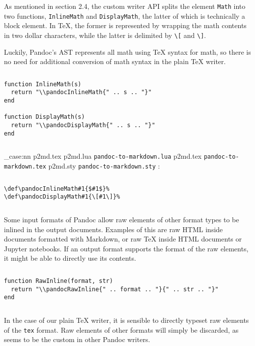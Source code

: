 \documentclass[
  digital,     %
  oneside,     %
  nosansbold,  %
  nocolorbold, %
  lof,         %
  lot,         %
]{fithesis4}
\newcommand\file[1]
  {
    \str_case:nn
      { #1 }
      {
        { p2md.lua } { \texttt{pandoc\hyp{}to\hyp{}markdown.lua} }
        { p2md.tex } { \texttt{pandoc\hyp{}to\hyp{}markdown.tex} }
        { p2md.sty } { \texttt{pandoc\hyp{}to\hyp{}markdown.sty} }
      }
  }
\begin{document}
$ $

\noindent
As mentioned in section 2.4, the custom writer API splits the element \texttt{Math} into two functions, \texttt{InlineMath} and \texttt{DisplayMath}, the latter of which is technically a block element. In \TeX{}, the former is represented by wrapping the math contents in two dollar characters, while the latter is delimited by \texttt{\textbackslash{}[} and \texttt{\textbackslash{}]}.

Luckily, Pandoc's AST represents all math using \TeX{} syntax for math, so there is no need for additional conversion of math syntax in the plain \TeX{} writer.

$ $

\noindent
\lstset{language=[5.3]Lua}
\begin{lstlisting}
function InlineMath(s)
  return "\\pandocInlineMath{" .. s .. "}"
end

function DisplayMath(s)
  return "\\pandocDisplayMath{" .. s .. "}"
end
\end{lstlisting}

$ $

\noindent
\file{p2md.tex}:

$ $

\noindent
\lstset{language=[plain]TeX}
\begin{lstlisting}
\def\pandocInlineMath#1{$#1$}%
\def\pandocDisplayMath#1{\[#1\]}%
\end{lstlisting}

$ $

\noindent
Some input formats of Pandoc allow raw elements of other format types to be inlined in the output documents. Examples of this are raw HTML inside documents formatted with Markdown, or raw \TeX{} inside HTML documents or Jupyter notebooks. If an output format supports the format of the raw elements, it might be able to directly use its contents.

$ $

\noindent
\lstset{language=[5.3]Lua}
\begin{lstlisting}
function RawInline(format, str)
  return "\\pandocRawInline{" .. format .. "}{" .. str .. "}"
end
\end{lstlisting}

$ $

\noindent
In the case of our plain \TeX{} writer, it is sensible to directly typeset raw elements of the \texttt{tex} format. Raw elements of other formats will simply be discarded, as seems to be the custom in other Pandoc writers.
\end{document}
